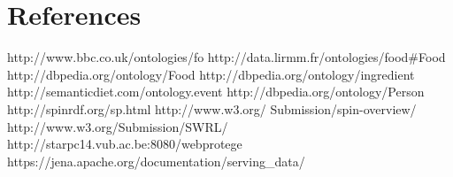 \section*{References}
http://www.bbc.co.uk/ontologies/fo\newline
http://data.lirmm.fr/ontologies/food\#Food\newline
http://dbpedia.org/ontology/Food \newline
http://dbpedia.org/ontology/ingredient\newline
http://semanticdiet.com/ontology.event \newline
http://dbpedia.org/ontology/Person \newline
http://spinrdf.org/sp.html\newline
http://www.w3.org/
Submission/spin-overview/\newline
http://www.w3.org/Submission/SWRL/\newline
http://starpc14.vub.ac.be:8080/webprotege \newline
https://jena.apache.org/documentation/serving\_data/

